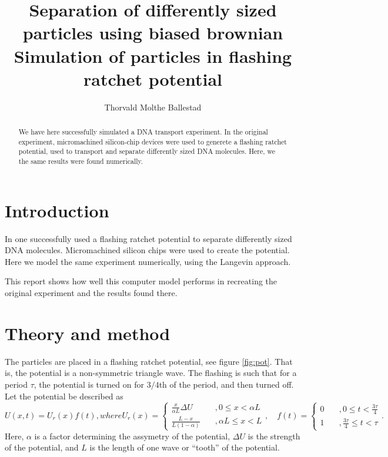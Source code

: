 \documentclass[a4paper, 12pt]{article}
\title{Separation of differently sized particles using biased brownian\\
  Simulation of particles in flashing ratchet potential}
\author{Thorvald Molthe Ballestad}
\begin{document}
\maketitle

\begin{abstract}
  We have here successfully simulated a DNA transport experiment.
  In the original experiment, micromachined silicon-chip devices were used to generete a flashing ratchet potential, used to transport and separate differently sized DNA molecules.
  Here, we the same results were found numerically.
\end{abstract}

\section{Introduction}
In \cite{experiment} one successfully used a flashing ratchet potential to separate differently sized DNA molecules.
Micromachined silicon chips were used to create the potential.
Here we model the same experiment numerically, using the Langevin approach.

This report shows how well this computer model performs in recreating the original experiment and the results found there.

\section{Theory and method}
The particles are placed in a flashing ratchet potential, see figure \ref{fig:pot}.
That is, the potential is a non-symmetric triangle wave.
The flashing is such that for a period $\tau$, the potential is turned on for $3/4$th of the period, and then turned off.
Let the potential be described as
\begin{subequations}
\begin{equation}
U(x, t) = U_r(x) f(t),
\end{equation}
where
\begin{equation}
U_r(x) =
\begin{cases}
\frac{x}{\alpha L} \Delta U&\quad, 0\leq x < \alpha L\\
\frac{L-x}{L(1-\alpha)}&\quad, \alpha L \leq x < L
\end{cases},
\quad
f(t) =
\begin{cases}
0&\quad, 0 \leq t < \frac{3\tau}{4}\\
1&\quad, \frac{3\tau}{4} \leq t < \tau
\end{cases}.
\end{equation}
\end{subequations}
Here, $\alpha$ is a factor determining the assymetry of the potential, $\Delta U$ is the strength of the potential, and $L$ is the length of one wave or ``tooth'' of the potential.
\end{document}
